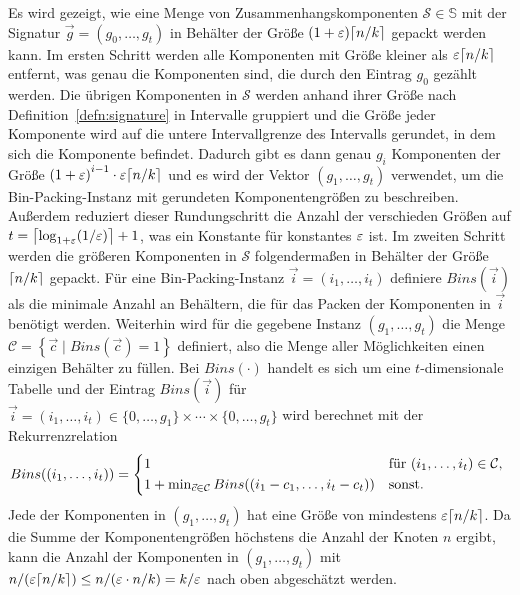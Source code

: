 Es wird gezeigt, wie eine Menge von Zusammenhangskomponenten $\mathcal{S} \in \mathbb{S}$ mit der Signatur $\vec{g} = (g_0, \ldots, g_t)$ in Behälter der Größe $(1 + \eps) \ceil{n/k}$ gepackt werden kann.
Im ersten Schritt werden alle Komponenten mit Größe kleiner als $\eps \ceil*{n/k}$ entfernt, was genau die Komponenten sind, die durch den Eintrag $g_0$ gezählt werden.
Die übrigen Komponenten in $\mathcal{S}$ werden anhand ihrer Größe nach Definition~\ref{defn:signature} in Intervalle gruppiert und die Größe jeder Komponente wird auf die untere Intervallgrenze des Intervalls gerundet, in dem sich die Komponente befindet.
Dadurch gibt es dann genau $g_i$ Komponenten der Größe ${(1 + \eps)}^{i-1} \cdot \eps \ceil*{n/k}$ und es wird der Vektor $(g_1, \ldots, g_t)$ verwendet, um die Bin-Packing-Instanz mit gerundeten Komponentengrößen zu beschreiben. 
Außerdem reduziert dieser Rundungschritt die Anzahl der verschieden Größen auf $t = \ceil*{\log_{1+\eps}(1/\eps)} + 1$, was ein Konstante für konstantes $\eps$ ist.
Im zweiten Schritt werden die größeren Komponenten in $\mathcal{S}$ folgendermaßen in Behälter der Größe $\ceil{n/k}$ gepackt.
Für eine Bin-Packing-Instanz $\vec{i} = (i_1, \ldots, i_t)$ definiere $Bins(\vec{i})$ als die minimale Anzahl an Behältern, die für das Packen der Komponenten in $\vec{i}$ benötigt werden.
Weiterhin wird für die gegebene Instanz $(g_1, \ldots, g_t)$ die Menge $\mathcal{C} = \left\{ \vec{c} \mid Bins(\vec{c}) = 1 \right\}$ definiert, also die Menge aller Möglichkeiten einen einzigen Behälter zu füllen.
Bei $Bins(\cdot)$ handelt es sich um eine $t$-dimensionale Tabelle und der Eintrag $Bins(\vec{i})$ für $\vec{i} = (i_1, \ldots, i_t) \in \{0, \ldots, g_1\} \times \cdots \times \{0, \ldots, g_t\}$ wird berechnet mit der Rekurrenzrelation 
\begin{equation*}
    Bins((i_1, \ldots, i_t)) = 
    \begin{cases*}
        1 & für $(i_1, \ldots, i_t) \in \mathcal{C}$, \\
        1 + \min_{\vec{c} \in \mathcal{C}} Bins((i_1 - c_1, \ldots, i_t - c_t)) & sonst. \\
    \end{cases*}
\end{equation*}
Jede der Komponenten in $(g_1, \ldots, g_t)$ hat eine Größe von mindestens $\eps \ceil*{n/k}$. 
Da die Summe der Komponentengrößen höchstens die Anzahl der Knoten $n$ ergibt, kann die Anzahl der Komponenten in $(g_1, \ldots, g_t)$ mit $n / (\eps \ceil{n/k}) \leq n / (\eps \cdot n/k) = k/\eps$ nach oben abgeschätzt werden.
